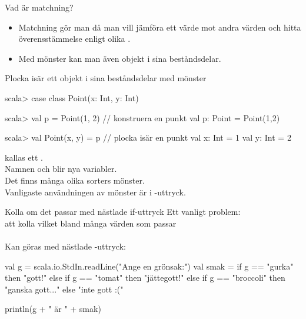 \begin{Slide}{Vad är matchning?}

  \begin{itemize}
    \item Matchning gör man då man vill jämföra ett värde mot andra värden och hitta överensstämmelse  enligt olika .
    \item Med mönster kan man även  objekt i sina beståndsdelar.
  \end{itemize}
\end{Slide}

\begin{Slide}{Plocka isär ett objekt i sina beståndsdelar med mönster}

\begin{REPLnonum}
scala> case class Point(x: Int, y: Int)

scala> val p = Point(1, 2)      // konstruera en punkt
val p: Point = Point(1,2)
\end{REPLnonum}

\pause 

\begin{REPLnonum}
scala> val Point(x, y) = p      // plocka isär en punkt
val x: Int = 1
val y: Int = 2
\end{REPLnonum}
\pause {} kallas ett .\\ Namnen  och  blir nya variabler.\\ Det finns många olika sorters mönster. \\
Vanligaste användningen av mönster är i -uttryck.
\end{Slide}


\begin{Slide}{Kolla om det passar med nästlade if-uttryck}
Ett vanligt problem: \\ att kolla vilket bland många värden som passar \\~\\

Kan göras med nästlade -uttryck:

\begin{Code}
val g = scala.io.StdIn.readLine("Ange en grönsak:")
val smak =
  if      g == "gurka"    then "gott!"
  else if g == "tomat"    then "jättegott!"
  else if g == "broccoli" then "ganska gott..."
  else "inte gott :("

println(g + " är " + smak)
\end{Code}
      
\end{Slide}


